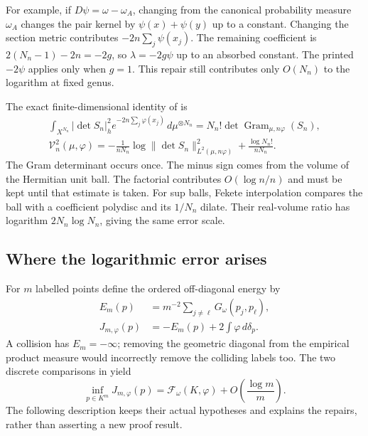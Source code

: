 For example, if $D\psi=\omega-\omega_A$, changing from the
canonical probability measure $\omega_A$ changes the pair
kernel by $\psi(x)+\psi(y)$ up to a constant. Changing the
section metric contributes $-2n\sum_j\psi(x_j)$.
The remaining coefficient is
$2(N_n-1)-2n=-2g$, so $\lambda=-2g\psi$ up to an absorbed
constant. The printed $-2\psi$ applies only when $g=1$.
This repair still contributes only $O(N_n)$ to the logarithm
at fixed genus.

The exact finite-dimensional identity of
\cite[Lemma~5.3]{BB10} is
\[
 \begin{gathered}
 \int_{X^{N_n}}|\det S_n|_h^2
       e^{-2n\sum_j\varphi(x_j)}\,d\mu^{\otimes N_n}
       =N_n!\det\operatorname{Gram}_{\mu,n\varphi}(S_n),\\
 \mathcal V_n^2(\mu,\varphi)
       =-\frac1{nN_n}\log\|\det S_n\|_{L^2(\mu,n\varphi)}^2
                            +\frac{\log N_n!}{nN_n}.
 \end{gathered}
 \tag{H.153}\label{eq:appH-curve-gram-volume}
\]
The Gram determinant occurs once. The minus sign comes from
the volume of the Hermitian unit ball. The factorial contributes
$O(\log n/n)$ and must be kept until that estimate is taken.
For sup balls, Fekete interpolation compares the ball with
a coefficient polydisc and its $1/N_n$ dilate. Their real-volume
ratio has logarithm $2N_n\log N_n$, giving the same error scale.

\subsection{Where the logarithmic error arises}

For $m$ labelled points define the ordered off-diagonal energy by
\[
 \begin{aligned}
 E_m(p)&=m^{-2}\sum_{j\ne\ell}G_\omega(p_j,p_\ell),\\
 J_{m,\varphi}(p)&=-E_m(p)+2\int\varphi\,d\delta_p.
 \end{aligned}
\]
A collision has $E_m=-\infty$; removing the geometric diagonal
from the empirical product measure would incorrectly remove
the colliding labels too. The two discrete comparisons in
\cite[Sections~5--7]{Wu26SectionBallRatesV1} yield
\[
 \inf_{p\in K^m}J_{m,\varphi}(p)
       =\mathcal F_\omega(K,\varphi)
                              +O\!\left(\frac{\log m}{m}\right).
 \tag{H.154}\label{eq:appH-curve-discrete-energy-rate}
\]
The following description keeps their actual hypotheses and
explains the repairs, rather than asserting a new proof result.

